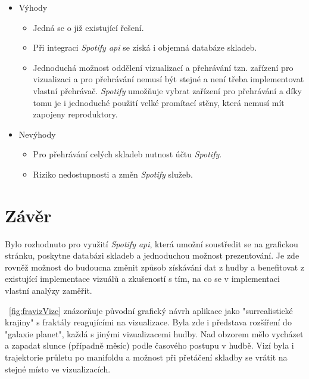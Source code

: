 \documentclass[thesis=B, czech]{FITthesis}[2019/03/06]
\begin{document}
\begin{itemize}
    \item Výhody
        \begin{itemize}
            \item Jedná se o již existující řešení.
            \item Při integraci \textit{Spotify \gls{api}} se získá i objemná databáze skladeb.
            \item Jednoduchá možnost oddělení vizualizací a přehrávání tzn. zařízení pro vizualizaci a pro přehrávání nemusí být stejné a není třeba implementovat vlastní přehrávač. \textit{Spotify} umožňuje vybrat zařízení pro přehrávání a díky tomu je i jednoduché použití velké promítací stěny, která nemusí mít zapojeny reproduktory.
        \end{itemize}
    \item Nevýhody
        \begin{itemize}
            \item Pro přehrávání celých skladeb nutnost účtu \textit{Spotify}.
            \item Riziko nedostupnosti a změn \textit{Spotify} služeb.
        \end{itemize}
\end{itemize}





\section{Závěr}

Bylo rozhodnuto pro využití \textit{Spotify \gls{api}}, která umožní soustředit se na grafickou stránku, poskytne databázi skladeb a jednoduchou možnost prezentování. Je zde rovněž možnost do budoucna změnit způsob získávání dat z hudby a benefitovat z existující implementace vizuálů a zkušeností s tím, na co se v implementaci vlastní analýzy zaměřit.

\figurename~\ref{fig:fravizVize} znázorňuje původní grafický návrh aplikace jako "surrealistické krajiny" s fraktály reagujícími na vizualizace. Byla zde i představa rozšíření do "galaxie planet", každá s jinými vizualizacemi hudby. Nad obzorem mělo vycházet a zapadat slunce (případně měsíc) podle časového postupu v hudbě. Vizí byla i trajektorie průletu po manifoldu a možnost při přetáčení skladby se vrátit na stejné místo ve vizualizacích.
\end{document}

